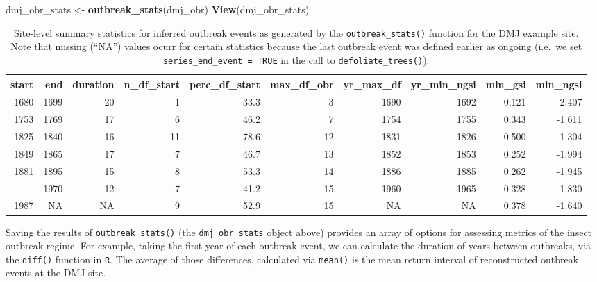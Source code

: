 \documentclass[review]{elsarticle} %
\newenvironment{Shaded}{\begin{snugshade}}{\end{snugshade}}
\newcommand{\KeywordTok}[1]{\textcolor[rgb]{0.13,0.29,0.53}{\textbf{#1}}}
\newcommand{\NormalTok}[1]{#1}
\newcommand{\StringTok}[1]{\textcolor[rgb]{0.31,0.60,0.02}{#1}}
\begin{document}
\begin{Shaded}
\begin{Highlighting}[]
\NormalTok{dmj_obr_stats <-}\StringTok{ }\KeywordTok{outbreak_stats}\NormalTok{(dmj_obr)}
\KeywordTok{View}\NormalTok{(dmj_obr_stats)}
\end{Highlighting}
\end{Shaded}



\begin{landscape}\begin{table}

\caption{\label{tab:tbl-obr}Site-level summary statistics for inferred outbreak events as generated by the \texttt{outbreak\_stats()} function for the DMJ example site. Note that missing (``NA'') values ocurr for certain statistics because the last outbreak event was defined earlier as ongoing (i.e.~we set \texttt{series\_end\_event\ =\ TRUE} in the call to \texttt{defoliate\_trees()}).}
\centering
\fontsize{7}{9}\selectfont
\begin{tabular}[t]{rrrrrrrrrr}
\toprule
start & end & duration & n\_df\_start & perc\_df\_start & max\_df\_obr & yr\_max\_df & yr\_min\_ngsi & min\_gsi & min\_ngsi\\
\midrule
1680 & 1699 & 20 & 1 & 33.3 & 3 & 1690 & 1692 & 0.121 & -2.407\\
1753 & 1769 & 17 & 6 & 46.2 & 7 & 1754 & 1755 & 0.343 & -1.611\\
1825 & 1840 & 16 & 11 & 78.6 & 12 & 1831 & 1826 & 0.500 & -1.304\\
1849 & 1865 & 17 & 7 & 46.7 & 13 & 1852 & 1853 & 0.252 & -1.994\\
1881 & 1895 & 15 & 8 & 53.3 & 14 & 1886 & 1885 & 0.262 & -1.945\\
\addlinespace
1959 & 1970 & 12 & 7 & 41.2 & 15 & 1960 & 1965 & 0.328 & -1.830\\
1987 & NA & NA & 9 & 52.9 & 15 & NA & NA & 0.378 & -1.640\\
\bottomrule
\end{tabular}
\end{table}
\end{landscape}

Saving the results of \texttt{outbreak\_stats()} (the \texttt{dmj\_obr\_stats} object above) provides an array of options for assessing metrics of the insect outbreak regime. For example, taking the first year of each outbreak event, we can calculate the duration of years between outbreaks, via the \texttt{diff()} function in \texttt{R}. The average of those differences, calculated via \texttt{mean()} is the mean return interval of reconstructed outbreak events at the DMJ site.
\end{document}
